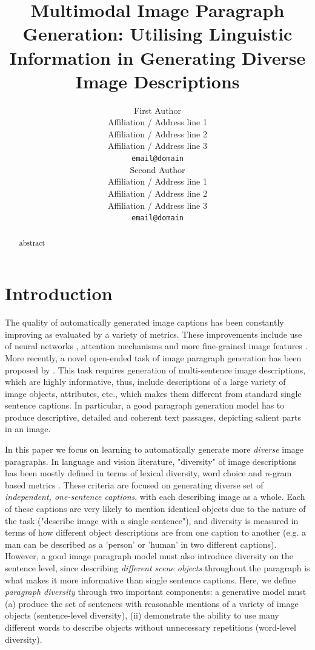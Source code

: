 \documentclass[11pt,a4paper]{article}
\title{Multimodal Image Paragraph Generation: Utilising Linguistic Information in Generating Diverse Image Descriptions}
\author{First Author \\
  Affiliation / Address line 1 \\
  Affiliation / Address line 2 \\
  Affiliation / Address line 3 \\
  \texttt{email@domain} \\\And
  Second Author \\
  Affiliation / Address line 1 \\
  Affiliation / Address line 2 \\
  Affiliation / Address line 3 \\
  \texttt{email@domain} \\}
\date{}
\begin{document}
\maketitle
\begin{abstract}
abstract

\end{abstract}

\section{Introduction}

The quality of automatically generated image captions \cite{bernardi2016automatic} has been constantly improving as evaluated by a variety of metrics.
These improvements include use of neural networks  \cite{kiros14,vinyals2014tell}, attention mechanisms \cite{xu2015attend} and more fine-grained image features \cite{anderson2017bottomup}.
More recently, a novel open-ended task of image paragraph generation has been proposed by .
This task requires generation of multi-sentence image descriptions, which are highly informative, thus, include descriptions of a large variety of image objects, attributes, etc., which makes them different from standard single sentence captions.
In particular, a good paragraph generation model has to produce descriptive, detailed and coherent text passages, depicting salient parts in an image.

In this paper we focus on learning to automatically generate more \textit{diverse} image paragraphs.
In language and vision literature, "diversity" of image descriptions has been mostly defined in terms of lexical diversity, word choice and \textit{n}-gram based metrics \cite{Devlin2015, Vijayakumar2016, Lindh2018, VanMiltenburg2018}.
These criteria are focused on generating diverse set of \textit{independent, one-sentence captions}, with each describing image as a whole.
Each of these captions are very likely to mention identical objects due to the nature of the task ("describe image with a single sentence"), and diversity is measured in terms of how different object descriptions are from one caption to another (e.g. a man can be described as a 'person' or 'human' in two different captions).
However, a good image paragraph model must also introduce diversity on the sentence level, since describing \textit{different scene objects} throughout the paragraph is what makes it more informative than single sentence captions.
Here, we define \textit{paragraph diversity} through two important components: a generative model must (a) produce the set of sentences with reasonable mentions of a variety of image objects (sentence-level diversity), (ii) demonstrate the ability to use many different words to describe objects without unnecessary repetitions (word-level diversity).
\end{document}
